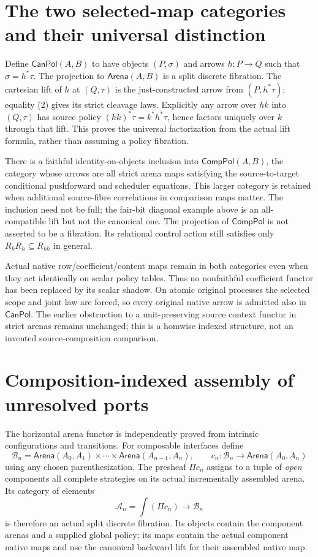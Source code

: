 \documentclass[11pt]{article}
\begin{document}
\section{The two selected-map categories and their universal distinction}
Define $\mathsf{CanPol}(A,B)$ to have objects $(P,\sigma)$ and arrows $h:P\to Q$ such that $\sigma=h^*\tau$. The projection to $\mathsf{Arena}(A,B)$ is a split discrete fibration. The cartesian lift of $h$ at $(Q,\tau)$ is the just-constructed arrow from $(P,h^*\tau)$; equality (2) gives its strict cleavage laws. Explicitly any arrow over $hk$ into $(Q,\tau)$ has source policy $(hk)^*\tau=k^*h^*\tau$, hence factors uniquely over $k$ through that lift. This proves the universal factorization from the actual lift formula, rather than assuming a policy fibration.

There is a faithful identity-on-objects inclusion into $\mathsf{CompPol}(A,B)$, the category whose arrows are all strict arena maps satisfying the source-to-target conditional pushforward and scheduler equations. This larger category is retained when additional source-fibre correlations in comparison maps matter. The inclusion need not be full; the fair-bit diagonal example above is an all-compatible lift but not the canonical one. The projection of $\mathsf{CompPol}$ is not asserted to be a fibration. Its relational control action still satisfies only $R_kR_h\subseteq R_{kh}$ in general.

Actual native row/coefficient/content maps remain in both categories even when they act identically on scalar policy tables. Thus no nonfaithful coefficient functor has been replaced by its scalar shadow. On atomic original processes the selected scope and joint law are forced, so every original native arrow is admitted also in $\mathsf{CanPol}$. The earlier obstruction to a unit-preserving source context functor in strict arenas remains unchanged; this is a homwise indexed structure, not an invented source-composition comparison.

\section{Composition-indexed assembly of unresolved ports}
The horizontal arena functor is independently proved from intrinsic configurations and transitions. For composable interfaces define
\[
 \mathcal B_n=\mathsf{Arena}(A_0,A_1)\times\cdots\times
 \mathsf{Arena}(A_{n-1},A_n),\qquad
 c_n:\mathcal B_n\to\mathsf{Arena}(A_0,A_n)
\]
using any chosen parenthesization. The presheaf $\Pi c_n$ assigns to a tuple of \emph{open} components all complete strategies on its actual incrementally assembled arena. Its category of elements
\[
 \mathcal A_n=\int(\Pi c_n)\longrightarrow\mathcal B_n\tag{3}
\]
is therefore an actual split discrete fibration. Its objects contain the component arenas and a supplied global policy; its maps contain the actual component native maps and use the canonical backward lift for their assembled native map.
\end{document}
